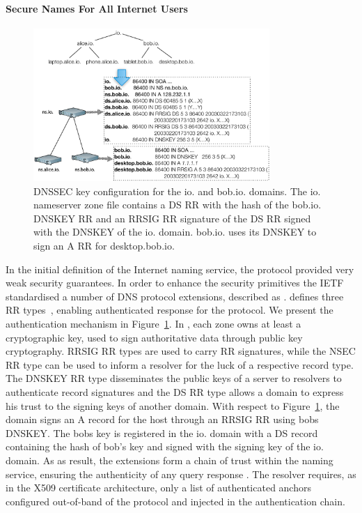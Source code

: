 \paragraph{Secure Names For All Internet Users}

\begin{figure}
  \centering
    \includegraphics[width=0.8\textwidth]{DNSSEC_hierarchy}
    \caption{DNSSEC key configuration for the io. and bob.io. domains. The io.
      nameserver zone file contains a DS RR with the hash of the bob.io. DNSKEY
      RR and an RRSIG RR signature of the DS RR signed with the DNSKEY of the
      io. domain. bob.io. uses its DNSKEY to sign an A RR for desktop.bob.io.}
  \label{fig:dnssec_hierarchy}
\end{figure}

In the initial definition of the Internet naming service, the protocol provided
very weak security guarantees. In order to enhance the security primitives the
IETF standardised a number of DNS protocol extensions, described as \dnssec.
\dnssec defines three RR types~\cite{RFC4034}, enabling authenticated response
for the protocol. We present the authentication mechanism in
Figure~\ref{fig:dnssec_hierarchy}. In \dnssec, each zone owns at least a
cryptographic key, used to sign authoritative data through public key cryptography. 
RRSIG RR types are used to carry RR signatures, while the NSEC RR
type can be used to inform a resolver for the luck of a respective record type.
The DNSKEY RR type disseminates the public keys of a server to resolvers to
authenticate record signatures and the DS RR type allows a domain to express his
trust to the signing keys of another domain. With respect to
Figure~\ref{fig:dnssec_hierarchy}, the domain  signs an A record for
the host  through an RRSIG RR using bobs DNSKEY. The bobs key is
registered in the  io. domain with a DS record containing the hash of bob's key
and signed with the signing key of the io. domain. 
  As as result, the \dnssec
extensions form a chain of trust within the naming service, ensuring the
authenticity of any query response . The resolver requires, as in the X509
certificate architecture, only a list of authenticated anchors configured
out-of-band of the protocol and injected in the authentication chain.

